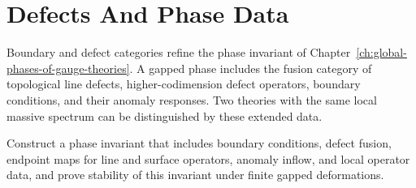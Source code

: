 \section{Defects And Phase Data}

Boundary and defect categories refine the phase invariant of
Chapter~\ref{ch:global-phases-of-gauge-theories}.  A gapped phase includes
the fusion category of topological line defects, higher-codimension defect
operators, boundary conditions, and their anomaly responses.  Two theories
with the same local massive spectrum can be distinguished by these extended
data.

\begin{openproblem}
\label{op:defect-complete-phase-classification}
Construct a phase invariant that includes boundary conditions, defect fusion,
endpoint maps for line and surface operators, anomaly inflow, and local
operator data, and prove stability of this invariant under finite gapped
deformations.
\end{openproblem}
